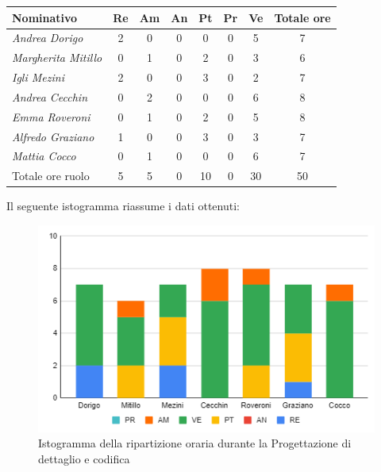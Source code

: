 {{{{{{{{{{{{{{		\begin{center}
			\renewcommand{\arraystretch}{1.4}
			\begin{tabularx}{\textwidth}{|X|c|c|c|c|c|c|c|}
				\hline
				\rowcolor{airforceblue}
				\textbf{Nominativo} & \textbf{Re} & \textbf{Am} & \textbf{An} & \textbf{Pt} & \textbf{Pr} & \textbf{Ve} & \textbf{Totale ore}\\
				\hline
				\textit{Andrea Dorigo} & 2 & 0 & 0 & 0 & 0 & 5 & 7\\
				\hline
				\textit{Margherita Mitillo} & 0 & 1 & 0 & 2 & 0 & 3 & 6\\
				\hline
				\textit{Igli Mezini} & 2 & 0 & 0 & 3 & 0 & 2 & 7\\
				\hline
				\textit{Andrea Cecchin} & 0 & 2 & 0 & 0 & 0 & 6 & 8\\
				\hline
				\textit{Emma Roveroni} & 0 & 1 & 0 & 2 & 0 & 5 & 8\\
				\hline
				\textit{Alfredo Graziano} & 1 & 0 & 0 & 3 & 0 & 3 & 7\\
				\hline
				\textit{Mattia Cocco} & 0 & 1 & 0 & 0 & 0 & 6 & 7\\
				\hline
				Totale ore ruolo & 5 & 5 & 0 & 10 & 0 & 30 & 50\\
				\hline
			\end{tabularx}
		\end{center}
		Il seguente istogramma riassume i dati ottenuti:
		\begin{figure}[!h]
			\begin{center}
				\includegraphics[width=0.7\linewidth]{../immagini/pdp/istogramma_progettazione_dettaglio_periodo3.png}
				\caption{Istogramma della ripartizione oraria durante la Progettazione di
					dettaglio e codifica}
			\end{center}
		\end{figure}
		\clearpage
}}}}}}}}}}}}}}
